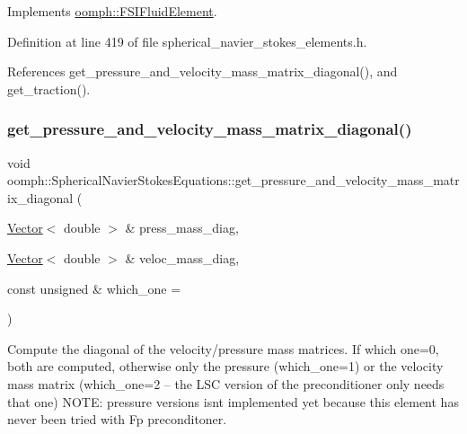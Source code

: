 Implements \hyperlink{classoomph_1_1FSIFluidElement_acf10e6a716b5e0f743579dfce32e9294}{oomph\+::\+F\+S\+I\+Fluid\+Element}.



Definition at line 419 of file spherical\+\_\+navier\+\_\+stokes\+\_\+elements.\+h.



References get\+\_\+pressure\+\_\+and\+\_\+velocity\+\_\+mass\+\_\+matrix\+\_\+diagonal(), and get\+\_\+traction().

\mbox{\label{classoomph_1_1SphericalNavierStokesEquations_a3cb7aec8278bb92aa731a19777608cac}} 
\subsubsection{\texorpdfstring{get\+\_\+pressure\+\_\+and\+\_\+velocity\+\_\+mass\+\_\+matrix\+\_\+diagonal()}{get\_pressure\_and\_velocity\_mass\_matrix\_diagonal()}}
{\footnotesize\ttfamily void oomph\+::\+Spherical\+Navier\+Stokes\+Equations\+::get\+\_\+pressure\+\_\+and\+\_\+velocity\+\_\+mass\+\_\+matrix\+\_\+diagonal (\begin{DoxyParamCaption}\item[{\hyperlink{classoomph_1_1Vector}{Vector}$<$ double $>$ \&}]{press\+\_\+mass\+\_\+diag,  }\item[{\hyperlink{classoomph_1_1Vector}{Vector}$<$ double $>$ \&}]{veloc\+\_\+mass\+\_\+diag,  }\item[{const unsigned \&}]{which\+\_\+one = {} }\end{DoxyParamCaption})\hspace{0.3cm}{\ttfamily [virtual]}}



Compute the diagonal of the velocity/pressure mass matrices. If which one=0, both are computed, otherwise only the pressure (which\+\_\+one=1) or the velocity mass matrix (which\+\_\+one=2 -- the L\+SC version of the preconditioner only needs that one) N\+O\+TE\+: pressure versions isn\textquotesingle{}t implemented yet because this element has never been tried with Fp preconditoner. 

